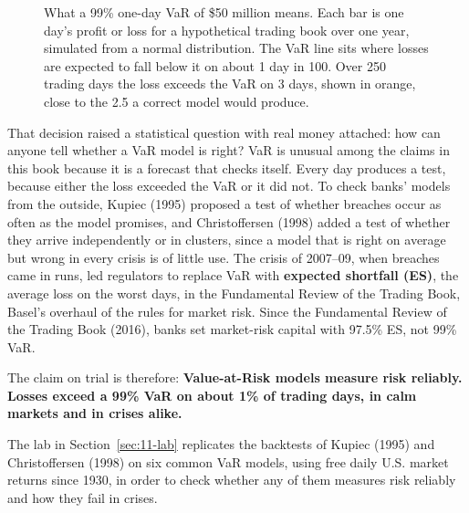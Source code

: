 \begin{figure}[htbp]
\caption{What a 99\% one-day VaR of \$50 million means. Each bar is one day's profit or loss for a hypothetical trading book over one year, simulated from a normal distribution. The VaR line sits where losses are expected to fall below it on about 1 day in 100. Over 250 trading days the loss exceeds the VaR on 3 days, shown in orange, close to the 2.5 a correct model would produce.}
\label{fig:11-var-intro}
\end{figure}


That decision raised a statistical question with real money attached: how can anyone tell whether a VaR model is right? VaR is unusual among the claims in this book because it is a forecast that checks itself. Every day produces a test, because either the loss exceeded the VaR or it did not. To check banks' models from the outside, Kupiec (1995) proposed a test of whether breaches occur as often as the model promises, and Christoffersen (1998) added a test of whether they arrive independently or in clusters, since a model that is right on average but wrong in every crisis is of little use. The crisis of 2007--09, when breaches came in runs, led regulators to replace VaR with \textbf{expected shortfall (ES)}, the average loss on the worst days, in the Fundamental Review of the Trading Book, Basel's overhaul of the rules for market risk.
Since the Fundamental Review of the Trading Book (2016), banks set market-risk capital with 97.5\% ES, not 99\% VaR. 


The claim on trial is therefore: \textbf{Value-at-Risk models measure risk reliably. Losses exceed a 99\% VaR on about 1\% of trading days, in calm markets and in crises alike.}

The lab in Section~\ref{sec:11-lab} replicates the backtests of Kupiec (1995) and Christoffersen (1998) on six common VaR models, using free daily U.S. market returns since 1930, in order to check whether any of them measures risk reliably and how they fail in crises.

